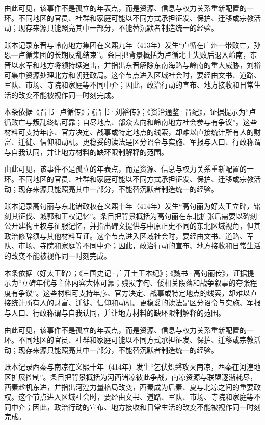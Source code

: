 由此可见，该事件不是孤立的年表点，而是资源、信息与权力关系重新配置的一环。不同地区的官员、社群和家庭可能以不同方式承担征发、保护、迁移或宗教活动；现存来源只能照亮其中一部分，不能替沉默者制造统一的经验。

账本记录东晋与岭南地方集团在义熙九年（413年）发生“卢循在广州一带败亡，孙恩—卢循集团的长期反乱结束”。条目把背景概括为卢循北上失败后退入岭南，东晋以水军和地方将领持续追击，并指出东晋解除东南海路与岭南的重大威胁，刘裕可集中资源处理北方和朝廷政局。这个节点进入区域社会时，要经由文书、道路、军队、市场、寺院和家庭等不同中介；因此，政治行动的宣布、地方接收和日常生活的改变不能被视作同一时刻完成。

本条依据《晋书·卢循传》；《晋书·刘裕传》；《资治通鉴·晋纪》，证据提示为“卢循败亡与叛乱终结可靠；自尽地点、部众去向和岭南地方社会参与有争议”。这些材料可支持年序、官方决定、战事或特定地点的线索，却难以直接统计所有人的财富、迁徙、信仰和动机。更稳妥的读法是区分诏令与实施、军报与人口、行政称谓与自我认同，并让地方材料的缺环限制解释的范围。

由此可见，该事件不是孤立的年表点，而是资源、信息与权力关系重新配置的一环。不同地区的官员、社群和家庭可能以不同方式承担征发、保护、迁移或宗教活动；现存来源只能照亮其中一部分，不能替沉默者制造统一的经验。

账本记录高句丽与东北诸政权在义熙十年（414年）发生“高句丽为好太王立碑，铭刻其征伐、城郭和王权记忆”。条目把背景概括为高句丽在东北扩张后需要以碑刻公开建构王权与征服记忆，并指出碑文提供与中原正史不同的东北区域视角，但其政治修辞须与其他材料互证。这个节点进入区域社会时，要经由文书、道路、军队、市场、寺院和家庭等不同中介；因此，政治行动的宣布、地方接收和日常生活的改变不能被视作同一时刻完成。

本条依据〈好太王碑〉；《三国史记·广开土王本纪》；《魏书·高句丽传》，证据提示为“立碑年代与主体内容大体可靠；残损字句、倭相关段落和战争叙事的夸张程度有争议”。这些材料可支持年序、官方决定、战事或特定地点的线索，却难以直接统计所有人的财富、迁徙、信仰和动机。更稳妥的读法是区分诏令与实施、军报与人口、行政称谓与自我认同，并让地方材料的缺环限制解释的范围。

由此可见，该事件不是孤立的年表点，而是资源、信息与权力关系重新配置的一环。不同地区的官员、社群和家庭可能以不同方式承担征发、保护、迁移或宗教活动；现存来源只能照亮其中一部分，不能替沉默者制造统一的经验。

账本记录西秦与南凉在义熙十年（414年）发生“乞伏炽磐攻灭南凉，西秦在河湟地区扩展控制”。条目把背景概括为河西诸凉彼此争战，南凉资源与联盟逐渐耗尽，西秦趁机东进，并指出河湟力量格局改变，西秦成为后秦、夏与北凉之间的重要政权。这个节点进入区域社会时，要经由文书、道路、军队、市场、寺院和家庭等不同中介；因此，政治行动的宣布、地方接收和日常生活的改变不能被视作同一时刻完成。

